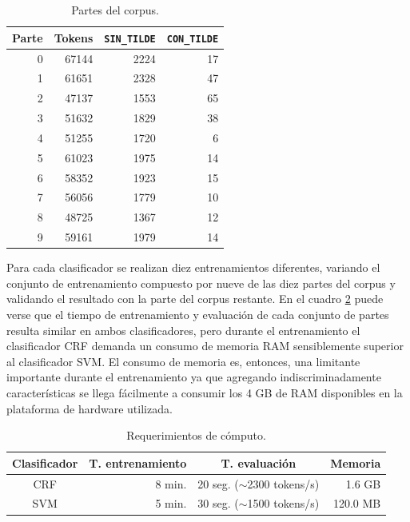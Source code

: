 \documentclass[runningheads,a4paper]{llncs}
\begin{document}
\begin{table}[ht]
 	\renewcommand{\arraystretch}{1.3}
	\renewcommand{\tabcolsep}{3pt}
	\caption{Partes del corpus.}
	\label{table:partes-corpus}
	\centering
	\begin{tabular}{r r r r}
		\hline\hline
		\multicolumn{1}{c}{\textbf{Parte}} 
		& \multicolumn{1}{c}{\textbf{Tokens}} 
		& \multicolumn{1}{c}{\textbf{\texttt{SIN\_TILDE}}} 
		& \multicolumn{1}{c}{\textbf{\texttt{CON\_TILDE}}} \\
		\hline
		0 & 67144 & 2224 & 17 \\
		1 & 61651 & 2328 & 47 \\
		2 & 47137 & 1553 & 65 \\
		3 & 51632 & 1829 & 38 \\
		4 & 51255 & 1720 & 6 \\
		5 & 61023 & 1975 & 14 \\
		6 & 58352 & 1923 & 15 \\
		7 & 56056 & 1779 & 10 \\
		8 & 48725 & 1367 & 12 \\
		9 & 59161 & 1979 & 14 \\
		\hline
	\end{tabular}
\end{table}

Para cada clasificador se realizan diez entrenamientos diferentes, variando el conjunto de entrenamiento compuesto por nueve de las diez partes del corpus y validando el resultado con la parte del corpus restante. En el cuadro \ref{table:tiempo-entrenamiento} puede verse que el tiempo de entrenamiento y evaluación de cada conjunto de partes resulta similar en ambos clasificadores, pero durante el entrenamiento el clasificador CRF demanda un consumo de memoria RAM sensiblemente superior al clasificador SVM. El consumo de memoria es, entonces, una limitante importante durante el entrenamiento ya que agregando indiscriminadamente características se llega fácilmente a consumir los 4 GB de RAM disponibles en la plataforma de hardware utilizada.

\begin{table}[ht]
 	\renewcommand{\arraystretch}{1.3}
	\renewcommand{\tabcolsep}{3pt}
	\caption{Requerimientos de c\'omputo.}
	\label{table:tiempo-entrenamiento}
	\centering
	\begin{tabular}{c r r r}
		\hline\hline
		\multicolumn{1}{c}{\textbf{Clasificador}} 
		& \multicolumn{1}{c}{\textbf{T. entrenamiento}} 
		& \multicolumn{1}{c}{\textbf{T. evaluaci\'on}} 
		& \multicolumn{1}{c}{\textbf{Memoria}} \\
		\hline
		CRF & 8 min. & 20 seg. ($\sim$2300 tokens/s) & 1.6 GB \\
		SVM & 5 min. & 30 seg. ($\sim$1500 tokens/s) & 120.0 MB \\
		\hline
	\end{tabular}
\end{table}
\end{document}
